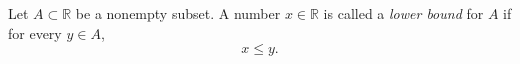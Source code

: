 Let $A \subset \mathbb{R}$ be a nonempty subset. A number $x \in \mathbb{R}$ is called a \textit{lower bound} for $A$ if for every $y \in A$,
\begin{equation*}
x \leq y.
\end{equation*}
